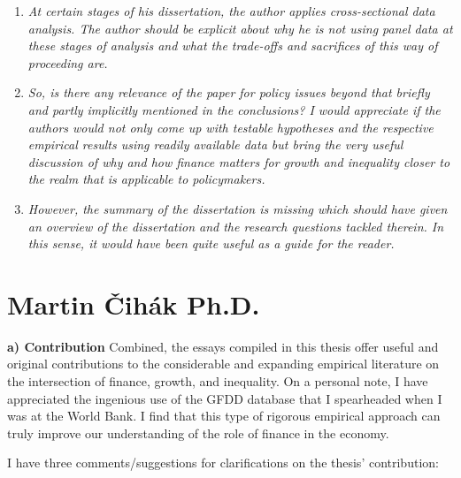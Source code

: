 \begin{enumerate}
    \item \textit{At certain stages of his dissertation, the author applies cross-sectional data analysis. The author should be explicit about why he is not using panel data at these stages of analysis and what the trade-offs and sacrifices of this way of proceeding are.}
    
    \item \textit{So, is there any relevance of the paper for policy issues beyond that briefly and partly implicitly mentioned in the conclusions? I would appreciate if the authors would not only come up with testable hypotheses and the respective empirical results using readily available data but bring the very useful discussion of why and how finance matters for growth and inequality closer to the realm that is applicable to policymakers.}

    \item \textit{However, the summary of the dissertation is missing which should have given an overview of the dissertation and the research questions tackled therein. In this sense, it would have been quite useful as a guide for the reader.}
\end{enumerate}

\section{Martin \v{C}ih\'{a}k Ph.D.}

\textbf{a) Contribution}
Combined, the essays compiled in this thesis offer useful and original contributions to the considerable and expanding empirical literature on the intersection of finance, growth, and inequality. On a personal note, I have appreciated the ingenious use of the GFDD database that I spearheaded when I was at the World Bank. I find that this type of rigorous empirical approach can truly improve our understanding of the role of finance in the economy.

I have three comments/suggestions for clarifications on the thesis' contribution:

